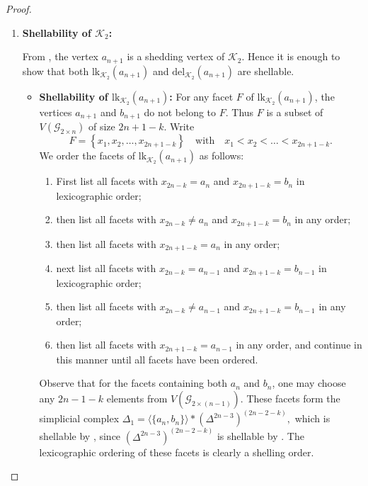 \documentclass[11pt,reqno,a4paper]{amsart}
\theoremstyle{definition}
\theoremstyle{theorem}
\newcommand{\kcut}{\Delta_{k}}
\newcommand{\twogg}{\mathcal{G}_{2\times n}}
\newcommand{\twoggn}{\mathcal{G}_{2\times \left(n+1\right)}}
\newcommand{\twoggp}{\mathcal{G}_{2\times n}'}
\newcommand{\lno}{\left(}
\newcommand{\rno}{\right)}
\newcommand{\lcu}{\left\{}
\newcommand{\rcu}{\right\}}
\newcommand{\K}{\mathcal{K}}
\newcommand{\lk}{\mathrm{lk}}
\newcommand{\del}{\mathrm{del}}
\theoremstyle{remark}
\begin{document}
\begin{proof}
\begin{enumerate}
\begin{itemize}
			We order the facets of $\Gamma'$ by listing first all facets that contain $a_n$ in lexicographic order, followed by the remaining facets in arbitrary order. Repeating the same argument used for $\Gamma$ above, we conclude that this ordering is a shelling order. Hence, $\Gamma'$ is shellable.
		\end{itemize}
			
	Hence, $\del_{\kcut\lno\twoggp\rno}\lno a_{n+1} \rno$ is shellable, and consequently $\K_1 = \lk_{\kcut \lno\twoggn\rno}\lno b_{n+1} \rno$ is shellable.

\item \textbf{Shellability of $\K_2$:}
			
			From , the vertex $a_{n+1}$ is a shedding vertex of $\K_2$. Hence it is enough to show that both $\lk_{\K_2}(a_{n+1})$ and $\del_{\K_2}\lno a_{n+1} \rno$ are shellable.
			
			\begin{itemize}
				\item \textbf{Shellability of $\lk_{\K_2}\lno a_{n+1} \rno$:}
			For any facet $F$ of $\lk_{\K_2}\lno a_{n+1} \rno$, the vertices $a_{n+1}$ and $b_{n+1}$ do not belong to $F$. Thus $F$ is a subset of $V \lno \twogg \rno$ of size $2n+1-k$. Write
			\[
			F = \lcu x_1, x_2, \dots, x_{2n+1-k} \rcu
			\quad\text{with}\quad
			x_1 < x_2 < \dots < x_{2n+1-k}.
			\]
			We order the facets of $\lk_{\K_2}\lno a_{n+1} \rno$ as follows:
			\begin{enumerate}[label = \roman*.]
				\item First list all facets with $x_{2n-k}=a_n$ and $x_{2n+1-k}=b_n$ in lexicographic order;
				\item then list all facets with $x_{2n-k}\neq a_n$ and $x_{2n+1-k}=b_n$ in any order;
				\item then list all facets with $x_{2n+1-k}=a_n$ in any order;
				\item next list all facets with $x_{2n-k}=a_{n-1}$ and $x_{2n+1-k}=b_{n-1}$ in lexicographic order;
				\item then list all facets with $x_{2n-k}\neq a_{n-1}$ and $x_{2n+1-k}=b_{n-1}$ in any order;
				\item then list all facets with $x_{2n+1-k}=a_{n-1}$ in any order, and continue in this manner until all facets have been ordered.
			\end{enumerate}
			
			Observe that for the facets containing both $a_n$ and $b_n$, one may choose any $2n-1-k$ elements from $V\lno \mathcal{G}_{2 \times \lno n-1 \rno}\rno$. These facets form the simplicial complex $\Delta_1 = \langle \{a_n,b_n\}\rangle * \lno \Delta^{2n-3}\rno^{\lno 2n-2-k \rno},$ which is shellable by , since $\lno \Delta^{2n-3}\rno^{\lno 2n-2-k \rno}$ is shellable by . The lexicographic ordering of these facets is clearly a shelling order.
			

\end{itemize}
\end{enumerate}
\end{proof}
\end{document}
